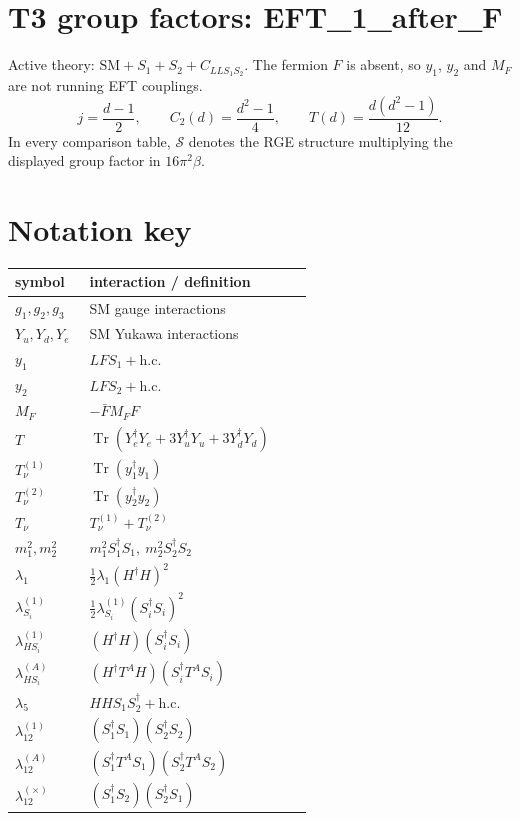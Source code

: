 \documentclass[9pt]{article}
\begin{document}
\section*{T3 group factors: EFT\_1\_after\_F}
Active theory: $\mathrm{SM}+S_1+S_2+C_{LLS_1S_2}$.  The fermion $F$ is absent, so $y_1$, $y_2$ and $M_F$ are not running EFT couplings.
\[j=\frac{d-1}{2},\qquad C_2(d)=\frac{d^2-1}{4},\qquad T(d)=\frac{d(d^2-1)}{12}.\]
In every comparison table, $\mathcal{S}$ denotes the RGE structure multiplying the displayed group factor in $16\pi^2\beta$.
\section*{Notation key}
\begin{longtable}{@{}p{0.23\linewidth}p{0.69\linewidth}@{}}
\toprule
symbol & interaction / definition \\
\midrule
$g_1,g_2,g_3$ & SM gauge interactions \\
$Y_u,Y_d,Y_e$ & SM Yukawa interactions \\
$y_1$ & $LFS_1+\mathrm{h.c.}$ \\
$y_2$ & $LFS_2+\mathrm{h.c.}$ \\
$M_F$ & $-\bar FM_FF$ \\
$T$ & $\operatorname{Tr}(Y_e^\dagger Y_e+3Y_u^\dagger Y_u+3Y_d^\dagger Y_d)$ \\
$T_\nu^{(1)}$ & $\operatorname{Tr}(y_1^\dagger y_1)$ \\
$T_\nu^{(2)}$ & $\operatorname{Tr}(y_2^\dagger y_2)$ \\
$T_\nu$ & $T_\nu^{(1)}+T_\nu^{(2)}$ \\
$m_1^2,m_2^2$ & $m_1^2S_1^\dagger S_1,\ m_2^2S_2^\dagger S_2$ \\
$\lambda_1$ & $\frac12\lambda_1(H^\dagger H)^2$ \\
$\lambda_{S_i}^{(1)}$ & $\frac12\lambda_{S_i}^{(1)}(S_i^\dagger S_i)^2$ \\
$\lambda_{HS_i}^{(1)}$ & $(H^\dagger H)(S_i^\dagger S_i)$ \\
$\lambda_{HS_i}^{(A)}$ & $(H^\dagger T^AH)(S_i^\dagger T^AS_i)$ \\
$\lambda_5$ & $HHS_1S_2^\dagger+\mathrm{h.c.}$ \\
$\lambda_{12}^{(1)}$ & $(S_1^\dagger S_1)(S_2^\dagger S_2)$ \\
$\lambda_{12}^{(A)}$ & $(S_1^\dagger T^AS_1)(S_2^\dagger T^AS_2)$ \\
$\lambda_{12}^{(\times)}$ & $(S_1^\dagger S_2)(S_2^\dagger S_1)$ \\
\bottomrule
\end{longtable}
\end{document}
